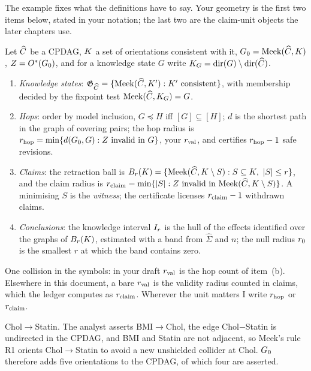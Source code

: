 The example fixes what the definitions have to say. Your geometry is the first two items below, stated
in your notation; the last two are the claim-unit objects the later chapters use.

\begin{definicao}
Let $\widehat{C}$ be a CPDAG, $K$ a set of orientations consistent with it, $G_0 = \mathrm{Meek}(\widehat{C},
K)$, $Z = O^{*}(G_0)$, and for a knowledge state $G$ write $K_G = \mathrm{dir}(G) \setminus
\mathrm{dir}(\widehat{C})$.
\begin{enumerate}[nosep, label=(\alph*)]
\item \emph{Knowledge states}: $\mathfrak{G}_{\widehat{C}} = \{\mathrm{Meek}(\widehat{C}, K') : K'
  \text{ consistent}\}$, with membership decided by the fixpoint test $\mathrm{Meek}(\widehat{C}, K_G) = G$.
\item \emph{Hops}: order by model inclusion, $G \preceq H$ iff $[G] \subseteq [H]$; $d$ is the shortest
  path in the graph of covering pairs; the hop radius is $r_{\mathrm{hop}} = \min\{d(G_0, G) : Z \text{ invalid in }
  G\}$, your $r_{\mathrm{val}}$, and certifies $r_{\mathrm{hop}} - 1$ safe revisions.
\item \emph{Claims}: the retraction ball is $B_{r}(K) = \{\mathrm{Meek}(\widehat{C}, K \setminus S) : S
  \subseteq K,\ |S| \le r\}$, and the claim radius is $r_{\mathrm{claim}} = \min\{|S| : Z \text{ invalid in }
  \mathrm{Meek}(\widehat{C}, K \setminus S)\}$. A minimising $S$ is the \emph{witness}; the certificate
  licenses $r_{\mathrm{claim}} - 1$ withdrawn claims.
\item \emph{Conclusions}: the knowledge interval $I_{r}$ is the hull of the effects identified over the
  graphs of $B_{r}(K)$, estimated with a band from $\widehat\Sigma$ and $n$; the null radius $r_{0}$ is the
  smallest $r$ at which the band contains zero.
\end{enumerate}
\end{definicao}

One collision in the symbols: in your draft $r_{\mathrm{val}}$ is the hop count of item~(b). Elsewhere in this
document, a bare $r_{\mathrm{val}}$ is the validity radius counted in claims, which the ledger computes as $r_{\mathrm{claim}}$.
Wherever the unit matters I write $r_{\mathrm{hop}}$ or $r_{\mathrm{claim}}$.

%
{Chol$\to$Statin. The analyst asserts BMI$\to$Chol, the edge Chol$-$Statin is undirected in the CPDAG,
and BMI and Statin are not adjacent, so Meek's rule R1 orients Chol$\to$Statin to avoid a new unshielded
collider at Chol. $G_0$ therefore adds five orientations to the CPDAG, of which four are asserted.}

